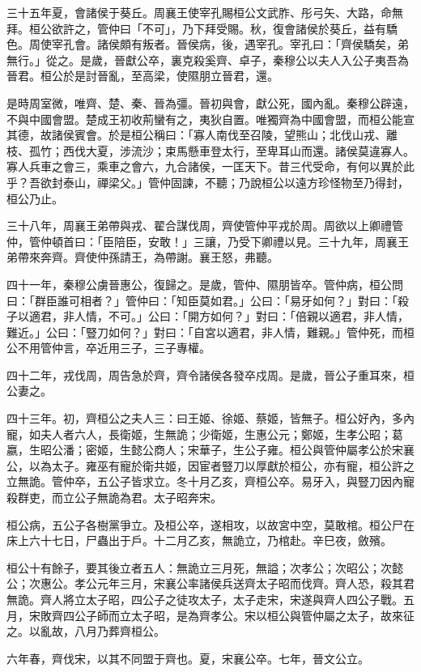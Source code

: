 \begin{pinyinscope}
三十五年夏，會諸侯于葵丘。周襄王使宰孔賜桓公文武胙、彤弓矢、大路，命無拜。桓公欲許之，管仲曰「不可」，乃下拜受賜。秋，復會諸侯於葵丘，益有驕色。周使宰孔會。諸侯頗有叛者。晉侯病，後，遇宰孔。宰孔曰：「齊侯驕矣，弟無行。」從之。是歲，晉獻公卒，裏克殺奚齊、卓子，秦穆公以夫人入公子夷吾為晉君。桓公於是討晉亂，至高梁，使隰朋立晉君，還。

是時周室微，唯齊、楚、秦、晉為彊。晉初與會，獻公死，國內亂。秦穆公辟遠，不與中國會盟。楚成王初收荊蠻有之，夷狄自置。唯獨齊為中國會盟，而桓公能宣其德，故諸侯賓會。於是桓公稱曰：「寡人南伐至召陵，望熊山；北伐山戎、離枝、孤竹；西伐大夏，涉流沙；束馬懸車登太行，至卑耳山而還。諸侯莫違寡人。寡人兵車之會三，乘車之會六，九合諸侯，一匡天下。昔三代受命，有何以異於此乎？吾欲封泰山，禪梁父。」管仲固諫，不聽；乃說桓公以遠方珍怪物至乃得封，桓公乃止。

三十八年，周襄王弟帶與戎、翟合謀伐周，齊使管仲平戎於周。周欲以上卿禮管仲，管仲頓首曰：「臣陪臣，安敢！」三讓，乃受下卿禮以見。三十九年，周襄王弟帶來奔齊。齊使仲孫請王，為帶謝。襄王怒，弗聽。

四十一年，秦穆公虜晉惠公，復歸之。是歲，管仲、隰朋皆卒。管仲病，桓公問曰：「群臣誰可相者？」管仲曰：「知臣莫如君。」公曰：「易牙如何？」對曰：「殺子以適君，非人情，不可。」公曰：「開方如何？」對曰：「倍親以適君，非人情，難近。」公曰：「豎刀如何？」對曰：「自宮以適君，非人情，難親。」管仲死，而桓公不用管仲言，卒近用三子，三子專權。

四十二年，戎伐周，周告急於齊，齊令諸侯各發卒戍周。是歲，晉公子重耳來，桓公妻之。

四十三年。初，齊桓公之夫人三：曰王姬、徐姬、蔡姬，皆無子。桓公好內，多內寵，如夫人者六人，長衛姬，生無詭；少衛姬，生惠公元；鄭姬，生孝公昭；葛嬴，生昭公潘；密姬，生懿公商人；宋華子，生公子雍。桓公與管仲屬孝公於宋襄公，以為太子。雍巫有寵於衛共姬，因宦者豎刀以厚獻於桓公，亦有寵，桓公許之立無詭。管仲卒，五公子皆求立。冬十月乙亥，齊桓公卒。易牙入，與豎刀因內寵殺群吏，而立公子無詭為君。太子昭奔宋。

桓公病，五公子各樹黨爭立。及桓公卒，遂相攻，以故宮中空，莫敢棺。桓公尸在床上六十七日，尸蟲出于戶。十二月乙亥，無詭立，乃棺赴。辛巳夜，斂殯。

桓公十有餘子，要其後立者五人：無詭立三月死，無謚；次孝公；次昭公；次懿公；次惠公。孝公元年三月，宋襄公率諸侯兵送齊太子昭而伐齊。齊人恐，殺其君無詭。齊人將立太子昭，四公子之徒攻太子，太子走宋，宋遂與齊人四公子戰。五月，宋敗齊四公子師而立太子昭，是為齊孝公。宋以桓公與管仲屬之太子，故來征之。以亂故，八月乃葬齊桓公。

六年春，齊伐宋，以其不同盟于齊也。夏，宋襄公卒。七年，晉文公立。


\end{pinyinscope}
